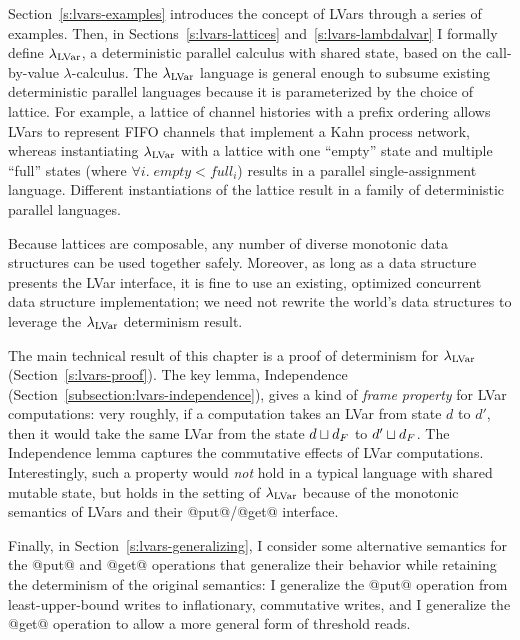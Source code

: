 Section~\ref{s:lvars-examples} introduces the concept of LVars through
a series of examples.  Then, in Sections~\ref{s:lvars-lattices}
and~\ref{s:lvars-lambdalvar} I formally define $\lambda_{\textrm{LVar}}$, a
deterministic parallel calculus with shared state, based on the
call-by-value $\lambda$-calculus.  The $\lambda_{\textrm{LVar}}$ language is
general enough to subsume existing deterministic parallel languages
because it is parameterized by the choice of lattice.  For example, a
lattice of channel histories with a prefix ordering allows LVars to
represent FIFO channels that implement a Kahn process network, whereas
instantiating $\lambda_{\textrm{LVar}}$ with a lattice with one ``empty'' state
and multiple ``full'' states (where $\forall{i}.\; \mathit{empty}
< \mathit{full_i}$) results in a parallel single-assignment language.
Different instantiations of the lattice result in a family of
deterministic parallel languages.

Because lattices are composable, any number of diverse monotonic data
structures can be used together safely.  Moreover, as long as a data
structure presents the LVar interface, it is fine to use an existing,
optimized concurrent data structure implementation; we need not
rewrite the world's data structures to leverage the $\lambda_{\textrm{LVar}}$
determinism result.

The main technical result of this chapter is a proof of determinism
for $\lambda_{\textrm{LVar}}$ (Section~\ref{s:lvars-proof}).  The key lemma,
Independence (Section~\ref{subsection:lvars-independence}), gives a
kind of \emph{frame property} for LVar computations: very roughly, if
a computation takes an LVar from state $d$ to $d'$, then it would take
the same LVar from the state $d \sqcup d_F$ to
$d' \sqcup d_F$.  The Independence lemma captures the commutative
effects of LVar computations.  Interestingly, such a property
would \emph{not} hold in a typical language with shared mutable state,
but holds in the setting of $\lambda_{\textrm{LVar}}$ because of the monotonic
semantics of LVars and their @put@/@get@ interface.

Finally, in Section~\ref{s:lvars-generalizing}, I consider some
alternative semantics for the @put@ and @get@ operations that
generalize their behavior while retaining the determinism of the
original semantics: I generalize the @put@ operation from
least-upper-bound writes to inflationary, commutative writes, and I
generalize the @get@ operation to allow a more general form of
threshold reads.
